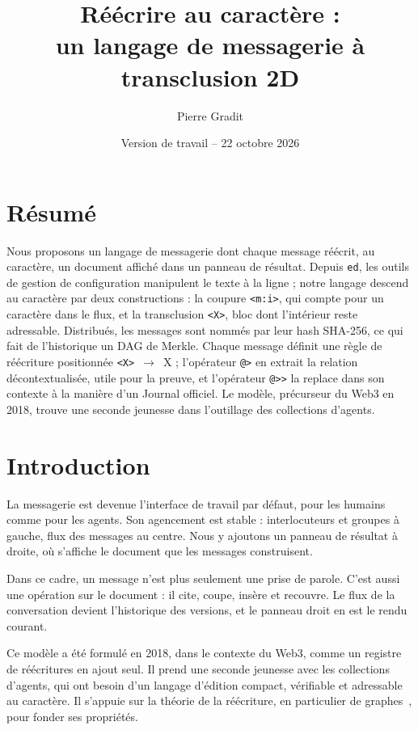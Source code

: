 \documentclass[11pt,a4paper]{article}
\title{Réécrire au caractère :\\un langage de messagerie à transclusion 2D}
\author{Pierre Gradit}
\date{Version de travail -- 22 octobre 2026}
\newcommand{\cd}[1]{\texttt{#1}}
\newcommand{\regle}[2]{\cd{<#1>}~$\to$~#2}
\begin{document}
\renewcommand{\refname}{Références}
\renewcommand{\tablename}{Table}
\maketitle

\section*{Résumé}

Nous proposons un langage de messagerie dont chaque message réécrit, au caractère, un document affiché dans un panneau de résultat. Depuis \cd{ed}, les outils de gestion de configuration manipulent le texte à la ligne ; notre langage descend au caractère par deux constructions : la coupure \cd{<m:i>}, qui compte pour un caractère dans le flux, et la transclusion \cd{<X>}, bloc dont l'intérieur reste adressable. Distribués, les messages sont nommés par leur hash SHA-256, ce qui fait de l'historique un DAG de Merkle. Chaque message définit une règle de réécriture positionnée \regle{X}{X} ; l'opérateur \cd{@>} en extrait la relation décontextualisée, utile pour la preuve, et l'opérateur \cd{@>{}>} la replace dans son contexte à la manière d'un Journal officiel. Le modèle, précurseur du Web3 en 2018, trouve une seconde jeunesse dans l'outillage des collections d'agents.

\section{Introduction}

La messagerie est devenue l'interface de travail par défaut, pour les humains comme pour les agents. Son agencement est stable : interlocuteurs et groupes à gauche, flux des messages au centre. Nous y ajoutons un panneau de résultat à droite, où s'affiche le document que les messages construisent.

Dans ce cadre, un message n'est plus seulement une prise de parole. C'est aussi une opération sur le document : il cite, coupe, insère et recouvre. Le flux de la conversation devient l'historique des versions, et le panneau droit en est le rendu courant.

Ce modèle a été formulé en 2018, dans le contexte du Web3, comme un registre de réécritures en ajout seul. Il prend une seconde jeunesse avec les collections d'agents, qui ont besoin d'un langage d'édition compact, vérifiable et adressable au caractère. Il s'appuie sur la théorie de la réécriture, en particulier de graphes~\cite{ehrig2006}, pour fonder ses propriétés.
\end{document}
